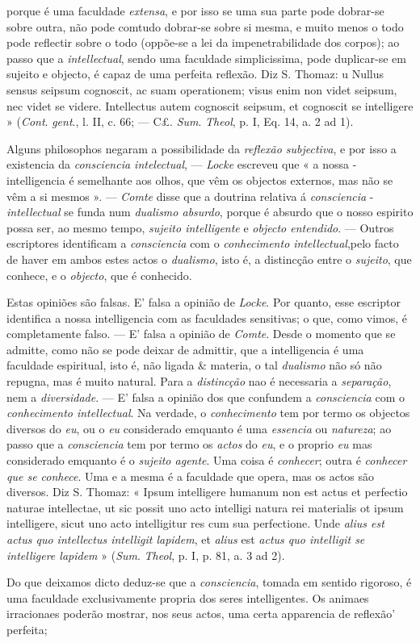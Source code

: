 porque é uma faculdade \emph{extensa}, e por isso se uma sua parte pode dobrar-se sobre outra, não pode comtudo dobrar-se sobre si mesma, e muito menos o todo pode reflectir sobre o todo (oppõe-se a lei da impenetrabilidade dos corpos); ao passo que a \emph{intellectual}, sendo uma faculdade simplicissima, pode duplicar-se em sujeito e objecto, é capaz de uma perfeita reflexão. Diz S. Thomaz: u Nullus sensus seipsum cognoscit, ac suam operationem; visus enim non videt seipsum, nec videt se videre. Intellectus autem cognoscit seipsum, et cognoscit se intelligere » (\emph{Cont}. \emph{gent}., l. II, c. 66; --- C£. \emph{Sum}. \emph{Theol}, p. I, Eq. 14, a. 2 ad 1).\par Alguns philosophos negaram a possibilidade da \emph{reflexão subjectiva}, e por isso a existencia da \emph{consciencia intelectual}, --- \emph{Locke} escreveu que « a nossa -intelligencia é semelhante aos olhos, que vêm os objectos externos, mas não se vêm a si mesmos ». --- \emph{Comte} disse que a doutrina relativa á \emph{consciencia} - \emph{intellectual} se funda num \emph{dualismo absurdo}, porque é absurdo que o nosso espirito possa ser, ao mesmo tempo, \emph{sujeito intelligente} e \emph{objecto entendido}. --- Outros escriptores identificam a \emph{consciencia} com o \emph{conhecimento intellectual},pelo facto de haver em ambos estes actos o \emph{dualismo}, isto é, a distincção entre o \emph{sujeito}, que conhece, e o \emph{objecto}, que é conhecido.\par Estas opiniões são falsas. E' falsa a opinião de \emph{Locke}. Por quanto, esse escriptor identifica a nossa intelligencia com as faculdades sensitivas; o que, como vimos, é completamente falso. --- E' falsa a opinião de \emph{Comte}. Desde o momento que se admitte, como não se pode deixar de admittir, que a intelligencia é uma faculdade espiritual, isto é, não ligada \& materia, o tal \emph{dualismo} não só não repugna, mas é muito natural. Para a \emph{distincção} nao é necessaria a \emph{separação}, nem a \emph{diversidade}. --- E' falsa a opinião dos que confundem a \emph{consciencia} com o \emph{conhecimento intellectual}. Na verdade, o \emph{conhecimento} tem por termo os objectos diversos do \emph{eu}, ou o \emph{eu} considerado emquanto é uma \emph{essencia} ou \emph{natureza}; ao passo que a \emph{consciencia} tem por termo os \emph{actos} do \emph{eu}, e o proprio \emph{eu} mas considerado emquanto é o \emph{sujeito agente}. Uma coisa é \emph{conhecer}; outra é \emph{conhecer que se conhece}. Uma e a mesma é a faculdade que opera, mas os actos são diversos. Diz S. Thomaz: « Ipsum intelligere humanum non est actus et perfectio naturae intellectae, ut sic possit uno acto intelligi natura rei materialis ot ipsum intelligere, sicut uno acto intelligitur res cum sua perfectione. Unde \emph{alius est actus quo intellectus intelligit lapidem}, et \emph{alius} est \emph{actus quo intelligit se intelligere lapidem} » (\emph{Sum}. \emph{Theol}, p. I, p. 81, a. 3 ad 2).\par Do que deixamos dicto deduz-se que a \emph{consciencia}, tomada em sentido rigoroso, é uma faculdade exclusivamente propria dos seres intelligentes. Os animaes irracionaes poderão mostrar, nos seus actos, uma certa apparencia de reflexão' perfeita; 